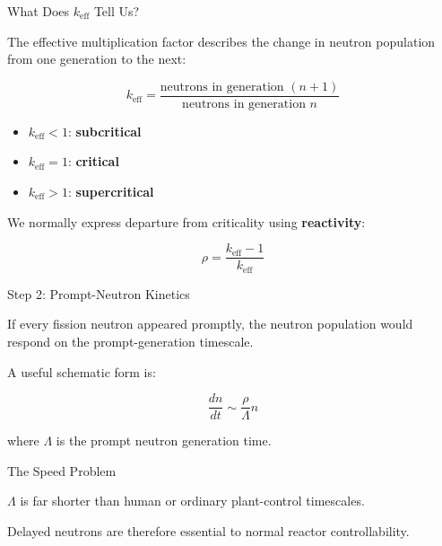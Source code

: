 \documentclass[aspectratio=169]{beamer}
\begin{document}
\begin{frame}{What Does $k_{\mathrm{eff}}$ Tell Us?}

    The effective multiplication factor describes the change in neutron
    population from one generation to the next:

    \[
        k_{\mathrm{eff}}
        =
        \frac{
            \text{neutrons in generation }(n+1)
        }{
            \text{neutrons in generation }n
        }
    \]

    \vspace{1em}

    \begin{itemize}

        \item $k_{\mathrm{eff}} < 1$:
              \textbf{subcritical}

        \item $k_{\mathrm{eff}} = 1$:
              \textbf{critical}

        \item $k_{\mathrm{eff}} > 1$:
              \textbf{supercritical}

    \end{itemize}

    \vspace{1em}

    We normally express departure from criticality using \textbf{reactivity}:

    \[
        \rho
        =
        \frac{k_{\mathrm{eff}}-1}{k_{\mathrm{eff}}}
    \]

\end{frame}



\begin{frame}{Step 2: Prompt-Neutron Kinetics}

    If every fission neutron appeared promptly, the neutron population would
    respond on the prompt-generation timescale.

    \vspace{1em}

    A useful schematic form is:

    \[
        \frac{dn}{dt}
        \sim
        \frac{\rho}{\Lambda} n
    \]

    where $\Lambda$ is the prompt neutron generation time.

    \vspace{1em}

    \begin{alertblock}{The Speed Problem}

        $\Lambda$ is far shorter than human or ordinary plant-control
        timescales.

        Delayed neutrons are therefore essential to normal reactor
        controllability.

    \end{alertblock}

\end{frame}
\end{document}
